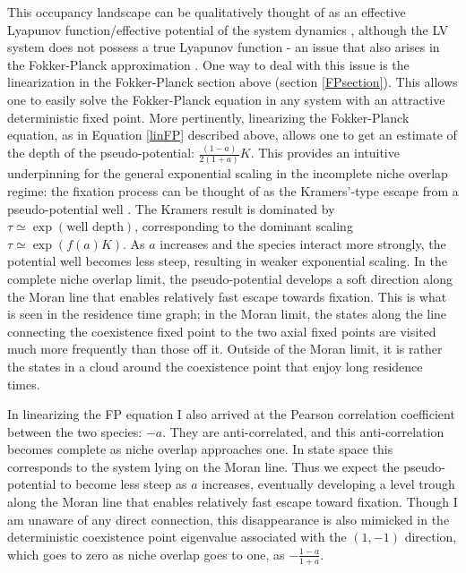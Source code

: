 This occupancy landscape can be qualitatively thought of as an effective Lyapunov function/effective potential of the system dynamics \cite{Zhou2012}, although the LV system does not possess a true Lyapunov function - an issue that also arises in the Fokker-Planck approximation \cite{Zhou2012,Chotibut2015}. 
One way to deal with this issue is the linearization in the Fokker-Planck section above (section \ref{FPsection}). 
This allows one to easily solve the Fokker-Planck equation in any system with an attractive deterministic fixed point. 
More pertinently, linearizing the Fokker-Planck equation, as in Equation \ref{linFP} described above, allows one to get an estimate of the depth of the pseudo-potential: $\frac{(1-a)}{2(1+a)}K$. 
This provides an intuitive underpinning for the general exponential scaling in the incomplete niche overlap regime: the fixation process can be thought of as the Kramers'-type escape from a pseudo-potential well \cite{Berglund2011}. 
The Kramers result is dominated by $\tau \simeq \exp(\text{well depth})$, corresponding to the dominant scaling $\tau \simeq \exp(f(a)K)$. 
As $a$ increases and the species interact more strongly, the potential well becomes less steep, resulting in weaker exponential scaling. 
In the complete niche overlap limit, the pseudo-potential develops a soft direction along the Moran line that enables relatively fast escape towards fixation.
This is what is seen in the residence time graph; in the Moran limit, the states along the line connecting the coexistence fixed point to the two axial fixed points are visited much more frequently than those off it. Outside of the Moran limit, it is rather the states in a cloud around the coexistence point that enjoy long residence times. 

In linearizing the FP equation I also arrived at the Pearson correlation coefficient between the two species: $-a$. 
They are anti-correlated, and this anti-correlation becomes complete as niche overlap approaches one. 
In state space this corresponds to the system lying on the Moran line. 
Thus we expect the pseudo-potential to become less steep as $a$ increases, eventually developing a level trough along the Moran line that enables relatively fast escape toward fixation. 
Though I am unaware of any direct connection, this disappearance is also mimicked in the deterministic coexistence point eigenvalue associated with the $(1,-1)$ direction, which goes to zero as niche overlap goes to one, as $-\frac{1-a}{1+a}$. %


